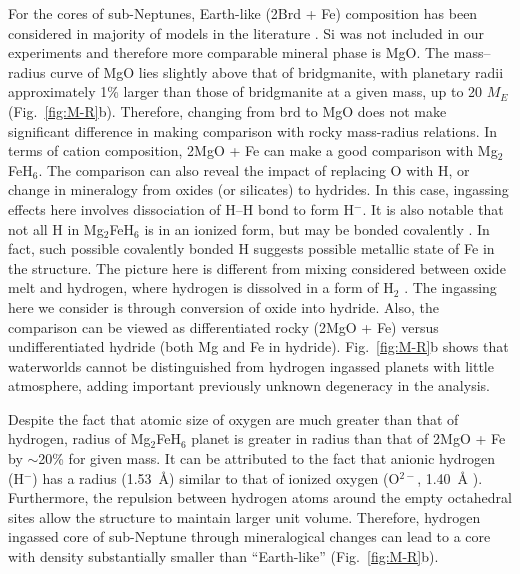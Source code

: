 \documentclass[draft,jgrga,12pt]{agujournal2019}
\begin{document}
For the cores of sub-Neptunes, Earth-like (2Brd + Fe) composition has been considered in majority of models in the literature \cite{valencia_internal_2006, sotin_mass_2007, zeng_detailed_2013}.
Si was not included in our experiments and therefore more comparable mineral phase is MgO.
The mass–radius curve of MgO lies slightly above that of bridgmanite, with planetary radii approximately 1\% larger than those of bridgmanite at a given mass, up to 20 $M_E$ (Fig.~\ref{fig:M-R}b).
Therefore, changing from brd to MgO does not make significant difference in making comparison with rocky mass-radius relations.
In terms of cation composition, 2MgO + Fe can make a good comparison with Mg$_2$FeH$_6$.
The comparison can also reveal the impact of replacing O with H, or change in mineralogy from oxides (or silicates) to hydrides.
In this case, ingassing effects here involves dissociation of H--H bond to form H$^{-}$.  
It is also notable that not all H in Mg$_2$FeH$_6$ is in an ionized form, but may be bonded covalently \cite{retuerto_neutron_2015}.
In fact, such possible covalently bonded H suggests possible metallic state of Fe in the structure.
The picture here is different from mixing considered between oxide melt and hydrogen, where hydrogen is dissolved in a form of H$_2$ \cite{gilmore_core_2026}.
The ingassing here we consider is through conversion of oxide into hydride.
Also, the comparison can be viewed as differentiated rocky (2MgO + Fe) versus undifferentiated hydride (both Mg and Fe in hydride).
Fig.~\ref{fig:M-R}b shows that waterworlds cannot be distinguished from hydrogen ingassed planets with little atmosphere, adding important previously unknown degeneracy in the analysis.

Despite the fact that atomic size of oxygen are much greater than that of hydrogen, radius of Mg$_2$FeH$_6$ planet is greater in radius than that of 2MgO + Fe by $\sim$20\% for given mass.  
It can be attributed to the fact that anionic hydrogen (H$^{-}$) has a radius (1.53~{\AA}) similar to that of ionized oxygen (O$^{2-}$, 1.40~{\AA} \cite{shannon_effective_1969}).
Furthermore, the repulsion between hydrogen atoms around the empty octahedral sites allow the structure to maintain larger unit volume.
Therefore, hydrogen ingassed core of sub-Neptune through mineralogical changes can lead to a core with density substantially smaller than ``Earth-like'' (Fig.~\ref{fig:M-R}b).
\end{document}

